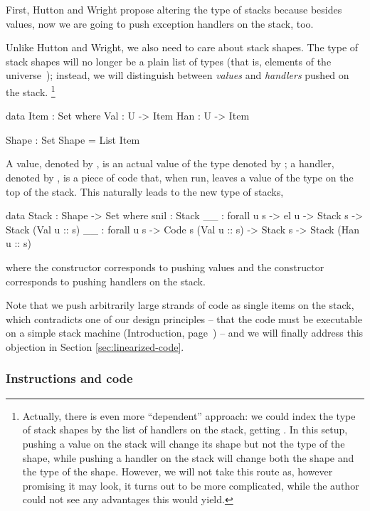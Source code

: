 First, Hutton and Wright propose altering the type of stacks because besides
values, now we are going to push exception handlers on the stack, too.

Unlike Hutton and Wright, we also need to care about stack shapes.  The type of
stack shapes will no longer be a plain list of types (that is, elements of the
universe~); instead, we  will distinguish between \emph{values} and
\emph{handlers} pushed on the stack.  \footnote{Actually, there is even more
	``dependent'' approach: we could index the type of stack shapes by the
	list of handlers on the stack, getting . In this setup, pushing a value on the stack will change its shape
	but not the type of the shape, while pushing a handler on the stack
	will change both the shape and the type of the shape. However, we will
	not take this route as, however promising it may look, it turns out to
	be more complicated, while the author could not see any advantages this
would yield.}

\begin{code}
  data Item : Set where
    Val : U -> Item
    Han : U -> Item

  Shape : Set
  Shape = List Item
\end{code}
A value, denoted by , is an actual value of the type
denoted by ; a handler, denoted by , is a piece of code
that, when run, leaves a value of the type  on the top of the stack.
This naturally leads to the new type of stacks,
\label{sec:gmh-ham-stack}\begin{code}
  data Stack : Shape -> Set where
    snil : Stack \NIL
    _\scons\_ : forall {u s} -> el u -> Stack s -> Stack (Val u :: s)
    _\sconsh\_ : forall {u s} -> Code s (Val u :: s) -> Stack s -> Stack (Han u :: s)
\end{code}
where the constructor \ident{\scons\!\!} corresponds to pushing values and the
constructor \ident{\sconsh\!\!} corresponds to pushing handlers on the stack.

Note that we push arbitrarily large strands of code as single items on the stack,
which contradicts one of our design principles -- that the
code must be executable on a simple stack machine (Introduction, page~\pageref{objectives})
-- and we will finally address this objection in Section \ref{sec:linearized-code}.

\subsubsection{Instructions and code}

